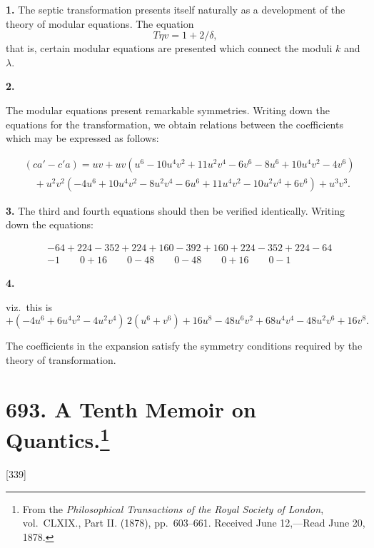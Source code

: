 \documentclass[12pt,a4paper]{article}
\theoremstyle{definition}
\begin{document}
\medskip
\noindent\textbf{1.}\quad
The septic transformation presents itself naturally as a development of the theory of modular equations. The equation
\[
T\eta v = 1 + 2/\delta,
\]
that is, certain modular equations are presented which connect the moduli $k$ and $\lambda$.

\medskip
\noindent\textbf{2.}

The modular equations present remarkable symmetries. Writing down the equations for the transformation, we obtain relations between the coefficients which may be expressed as follows:

\begin{align*}
&(ca' - c'a) = uv + uv(u^6 - 10u^4v^2 + 11u^2v^4 - 6v^6 - 8u^6 + 10u^4v^2 - 4v^6)\\
&\quad + u^2v^2(-4u^6 + 10u^4v^2 - 8u^2v^4 - 6u^6 + 11u^4v^2 - 10u^2v^4 + 6v^6) + u^3v^3.
\end{align*}

\medskip
\noindent\textbf{3.}\quad
The third and fourth equations should then be verified identically. Writing down the equations:

\begin{align*}
&-64 + 224 - 352 + 224 + 160 - 392 + 160 + 224 - 352 + 224 - 64\\
&-1 \qquad 0 + 16 \qquad 0 - 48 \qquad 0 - 48 \qquad 0 + 16 \qquad 0 - 1
\end{align*}

\medskip
\noindent\textbf{4.}

viz.\ this is
\[
+ (-4u^6 + 6u^4v^2 - 4u^2v^4)\, 2(u^6 + v^6) + 16u^8 - 48u^6v^2 + 68u^4v^4 - 48u^2v^6 + 16v^8.
\]

The coefficients in the expansion satisfy the symmetry conditions required by the theory of transformation.

\newpage
\section[A Tenth Memoir on Quantics]{693. A Tenth Memoir on Quantics.\footnote{From the \textit{Philosophical Transactions of the Royal Society of London}, vol.\ CLXIX., Part II. (1878), pp.\ 603--661. Received June 12,---Read June 20, 1878.}}

[339]
\end{document}
